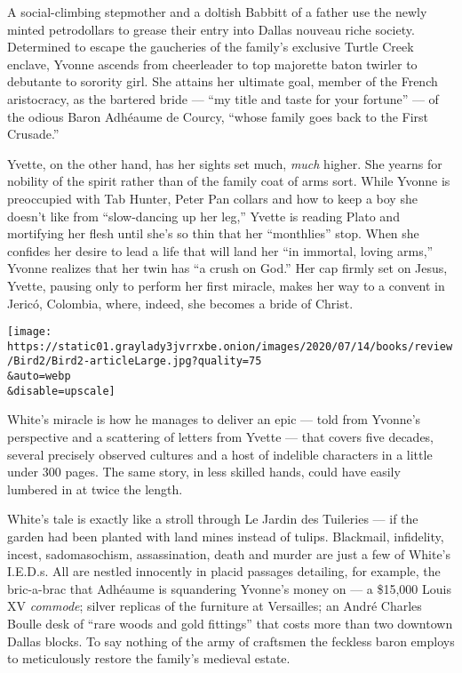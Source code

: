 A social-climbing stepmother and a doltish Babbitt of a father use the
newly minted petrodollars to grease their entry into Dallas nouveau
riche society. Determined to escape the gaucheries of the family's
exclusive Turtle Creek enclave, Yvonne ascends from cheerleader to top
majorette baton twirler to debutante to sorority girl. She attains her
ultimate goal, member of the French aristocracy, as the bartered bride
--- ``my title and taste for your fortune'' --- of the odious Baron
Adhéaume de Courcy, ``whose family goes back to the First Crusade.''

Yvette, on the other hand, has her sights set much, \emph{much} higher.
She yearns for nobility of the spirit rather than of the family coat of
arms sort. While Yvonne is preoccupied with Tab Hunter, Peter Pan
collars and how to keep a boy she doesn't like from ``slow-dancing up
her leg,'' Yvette is reading Plato and mortifying her flesh until she's
so thin that her ``monthlies'' stop. When she confides her desire to
lead a life that will land her ``in immortal, loving arms,'' Yvonne
realizes that her twin has ``a crush on God.'' Her cap firmly set on
Jesus, Yvette, pausing only to perform her first miracle, makes her way
to a convent in Jericó, Colombia, where, indeed, she becomes a bride of
Christ.

\texttt{[image: https://static01.graylady3jvrrxbe.onion/images/2020/07/14/books/review/Bird2/Bird2-articleLarge.jpg?quality=75\\\&auto=webp\\\&disable=upscale]}

White's miracle is how he manages to deliver an epic --- told from
Yvonne's perspective and a scattering of letters from Yvette --- that
covers five decades, several precisely observed cultures and a host of
indelible characters in a little under 300 pages. The same story, in
less skilled hands, could have easily lumbered in at twice the length.

White's tale is exactly like a stroll through Le Jardin des Tuileries
--- if the garden had been planted with land mines instead of tulips.
Blackmail, infidelity, incest, sadomasochism, assassination, death and
murder are just a few of White's I.E.D.s. All are nestled innocently in
placid passages detailing, for example, the bric-a-brac that Adhéaume is
squandering Yvonne's money on --- a \$15,000 Louis XV \emph{commode};
silver replicas of the furniture at Versailles; an André Charles Boulle
desk of ``rare woods and gold fittings'' that costs more than two
downtown Dallas blocks. To say nothing of the army of craftsmen the
feckless baron employs to meticulously restore the family's medieval
estate.

